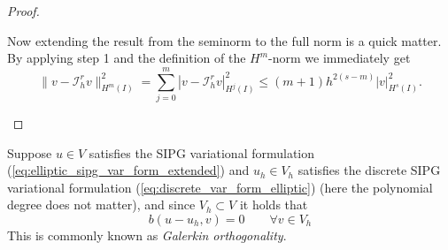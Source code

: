 \begin{proof}
	\begin{proofstep}
		Now extending the result from the seminorm to the full norm is a quick matter. By applying step 1 and the definition of the $H^m$-norm we immediately get  
		\begin{equation*}
			\| v - \mathcal{I}_h^r v \|_{H^m(I)}^2 = \sum_{j = 0}^{m} | v - \mathcal{I}_h^r v |_{H^j(I)}^2 \leq (m+1) h^{2(s-m)} |v|_{H^s(I)}^2.
		\end{equation*}
	\end{proofstep}
\end{proof}

Suppose $u \in V$ satisfies the SIPG variational formulation (\ref{eq:elliptic_sipg_var_form_extended}) and 
$u_h \in V_h$ satisfies the discrete SIPG variational formulation (\ref{eq:discrete_var_form_elliptic}) (here the polynomial degree does not matter),  
and since $V_h \subset V$ it holds that 
\begin{equation}
	\label{eq:galerkin_orthogonality}
	b(u - u_h, v) = 0 \qquad \forall v \in V_h
\end{equation}
This is commonly known as \textit{Galerkin orthogonality}. \\
